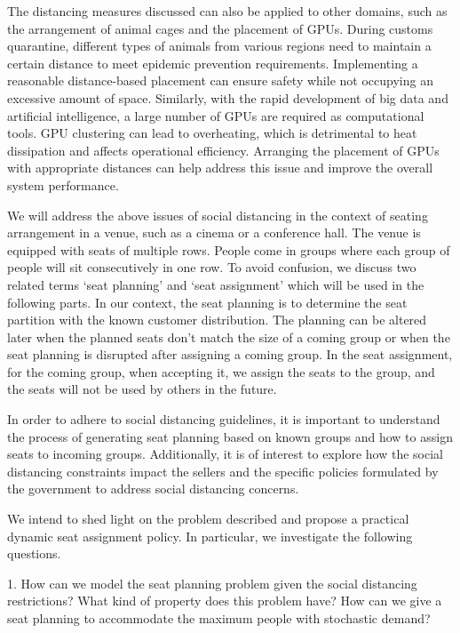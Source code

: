 The distancing measures discussed can also be applied to other domains, such as the arrangement of animal cages and the placement of GPUs. During customs quarantine, different types of animals from various regions need to maintain a certain distance to meet epidemic prevention requirements. Implementing a reasonable distance-based placement can ensure safety while not occupying an excessive amount of space. Similarly, with the rapid development of big data and artificial intelligence, a large number of GPUs are required as computational tools. GPU clustering can lead to overheating, which is detrimental to heat dissipation and affects operational efficiency. Arranging the placement of GPUs with appropriate distances can help address this issue and improve the overall system performance.

We will address the above issues of social distancing in the context of seating arrangement in a venue, such as a cinema or a conference hall. The venue is equipped with seats of multiple rows.  People come in groups where each group of people will sit consecutively in one row. 
To avoid confusion, we discuss two related terms `seat planning' and `seat assignment' which will be used in the following parts. In our context, the seat planning is to determine the seat partition with the known customer distribution. The planning can be altered later when the planned seats don't match the size of a coming group or when the seat planning is disrupted after assigning a coming group. In the seat assignment, for the coming group, when accepting it, we assign the seats to the group, and the seats will not be used by others in the future.

In order to adhere to social distancing guidelines, it is important to understand the process of generating seat planning based on known groups and how to assign seats to incoming groups. Additionally, it is of interest to explore how the social distancing constraints impact the sellers and the specific policies formulated by the government to address social distancing concerns.

We intend to shed light on the problem described and propose a practical dynamic seat assignment policy. In particular, we investigate the following questions. 

1. How can we model the seat planning problem given the social distancing restrictions? What kind of property does this problem have? How can we give a seat planning to accommodate the maximum people with stochastic demand?

